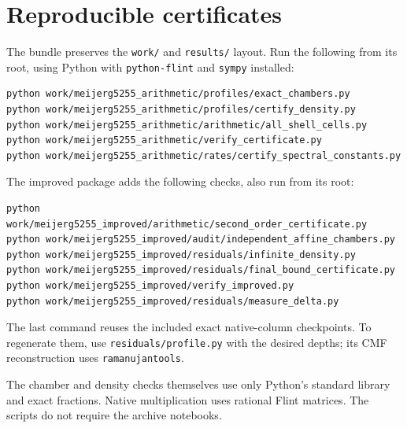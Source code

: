 \documentclass[11pt]{article}
\begin{document}
\section{Reproducible certificates}
The bundle preserves the \texttt{work/} and \texttt{results/} layout.
Run the following from its root, using Python with \texttt{python-flint}
and \texttt{sympy} installed:
\begin{verbatim}
python work/meijerg5255_arithmetic/profiles/exact_chambers.py
python work/meijerg5255_arithmetic/profiles/certify_density.py
python work/meijerg5255_arithmetic/arithmetic/all_shell_cells.py
python work/meijerg5255_arithmetic/verify_certificate.py
python work/meijerg5255_arithmetic/rates/certify_spectral_constants.py
\end{verbatim}

The improved package adds the following checks, also run from its root:
\begin{verbatim}
python work/meijerg5255_improved/arithmetic/second_order_certificate.py
python work/meijerg5255_improved/audit/independent_affine_chambers.py
python work/meijerg5255_improved/residuals/infinite_density.py
python work/meijerg5255_improved/residuals/final_bound_certificate.py
python work/meijerg5255_improved/verify_improved.py
python work/meijerg5255_improved/residuals/measure_delta.py
\end{verbatim}
The last command reuses the included exact native-column checkpoints.
To regenerate them, use \texttt{residuals/profile.py} with the desired
depths; its CMF reconstruction uses \texttt{ramanujantools}.

The chamber and density checks themselves use only Python's standard
library and exact fractions. Native multiplication uses rational Flint
matrices. The scripts do not require the archive notebooks.
\end{document}
